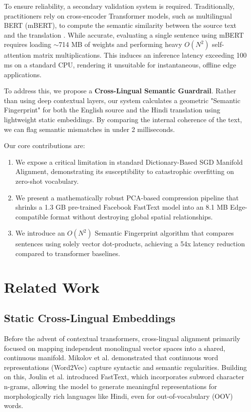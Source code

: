 \documentclass[conference]{IEEEtran}
\begin{document}
To ensure reliability, a secondary validation system is required. Traditionally, practitioners rely on cross-encoder Transformer models, such as multilingual BERT (mBERT), to compute the semantic similarity between the source text and the translation \cite{b2}. While accurate, evaluating a single sentence using mBERT requires loading $\sim$714 MB of weights and performing heavy $O(N^2)$ self-attention matrix multiplications. This induces an inference latency exceeding 100 ms on a standard CPU, rendering it unsuitable for instantaneous, offline edge applications.

To address this, we propose a \textbf{Cross-Lingual Semantic Guardrail}. Rather than using deep contextual layers, our system calculates a geometric "Semantic Fingerprint" for both the English source and the Hindi translation using lightweight static embeddings. By comparing the internal coherence of the text, we can flag semantic mismatches in under 2 milliseconds.

Our core contributions are:
\begin{enumerate}
    \item We expose a critical limitation in standard Dictionary-Based SGD Manifold Alignment, demonstrating its susceptibility to catastrophic overfitting on zero-shot vocabulary.
    \item We present a mathematically robust PCA-based compression pipeline that shrinks a 1.3 GB pre-trained Facebook FastText model into an 8.1 MB Edge-compatible format without destroying global spatial relationships.
    \item We introduce an $O(N^2)$ Semantic Fingerprint algorithm that compares sentences using solely vector dot-products, achieving a 54x latency reduction compared to transformer baselines.
\end{enumerate}

\section{Related Work}
\subsection{Static Cross-Lingual Embeddings}
Before the advent of contextual transformers, cross-lingual alignment primarily focused on mapping independent monolingual vector spaces into a shared, continuous manifold. Mikolov et al. \cite{b3} demonstrated that continuous word representations (Word2Vec) capture syntactic and semantic regularities. Building on this, Joulin et al. \cite{b4} introduced FastText, which incorporates subword character n-grams, allowing the model to generate meaningful representations for morphologically rich languages like Hindi, even for out-of-vocabulary (OOV) words.
\end{document}
